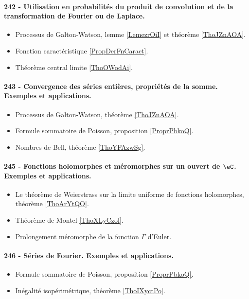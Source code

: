 \paragraph{242 - Utilisation en probabilités du produit de convolution et de la transformation de Fourier ou de Laplace.}
\begin{itemize}
    \item Processus de Galton-Watson, lemme \ref{LemezrOiI} et théorème \ref{ThoJZnAOA}.
    \item Fonction caractéristique \ref{PropDerFnCaract}.
    \item Théorème central limite \ref{ThoOWodAi}.
\end{itemize}
\paragraph{243 - Convergence des séries entières, propriétés de la somme. Exemples et applications.}
\begin{itemize}
    \item Processus de Galton-Watson, théorème \ref{ThoJZnAOA}.
    \item Formule sommatoire de Poisson, proposition \ref{ProprPbkoQ}.
    \item Nombres de Bell, théorème \ref{ThoYFAzwSg}.
\end{itemize}
\paragraph{245 - Fonctions holomorphes et méromorphes sur un ouvert de \( \eC\). Exemples et applications.}
\begin{itemize}
    \item Le théorème de Weierstrass sur la limite uniforme de fonctions holomorphes, théorème \ref{ThoArYtQO}.
    \item Théorème de Montel \ref{ThoXLyCzol}.
    \item Prolongement méromorphe de la fonction \( \Gamma\) d'Euler.
\end{itemize}
\paragraph{246 - Séries de Fourier. Exemples et applications.}
\begin{itemize}
    \item Formule sommatoire de Poisson, proposition \ref{ProprPbkoQ}.
    \item Inégalité isopérimétrique, théorème \ref{ThoIXyctPo}.
\end{itemize}
